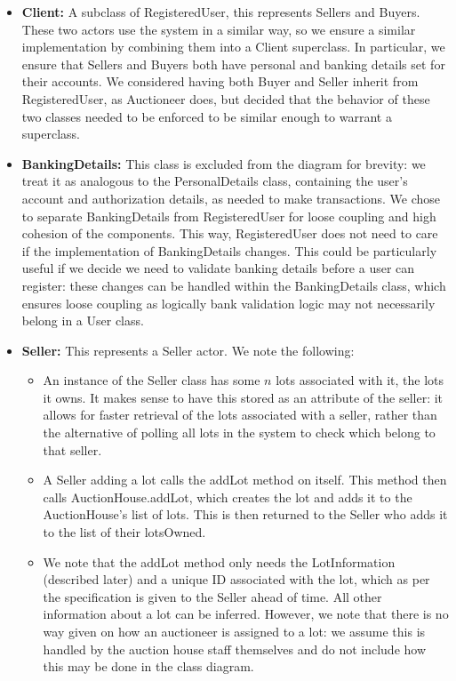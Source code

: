 \documentclass[titlepage, 12pt]{extarticle}
\begin{document}
\begin{itemize}
\item {\bf Client: } A subclass of RegisteredUser, this represents Sellers and Buyers. These two actors use the system in a similar way, so we ensure a similar implementation by combining them into a Client superclass. In particular, we ensure that Sellers and Buyers both have personal and banking details set for their accounts. We considered having both Buyer and Seller inherit from RegisteredUser, as Auctioneer does, but decided that the behavior of these two classes needed to be enforced to be similar enough to warrant a superclass. 
\item {\bf BankingDetails: } This class is excluded from the diagram for brevity: we treat it as analogous to the PersonalDetails class, containing the user's account and authorization details, as needed to make transactions. We chose to separate BankingDetails from RegisteredUser for loose coupling and high cohesion of the components. This way, RegisteredUser does not need to care if the implementation of BankingDetails changes. This could be particularly useful if we decide we need to validate banking details before a user can register: these changes can be handled within the BankingDetails class, which ensures loose coupling as logically bank validation logic may not necessarily belong in a User class. 
\item {\bf Seller: } This represents a Seller actor. We note the following:
  \begin{itemize}
  \item An instance of the Seller class has some $n$ lots associated with it, the lots it owns. It makes sense to have this stored as an attribute of the seller: it allows for faster retrieval of the lots associated with a seller, rather than the alternative of polling all lots in the system to check which belong to that seller. 
  \item A Seller adding a lot calls the addLot method on itself. This method then calls AuctionHouse.addLot, which creates the lot and adds it to the AuctionHouse's list of lots. This is then returned to the Seller who adds it to the list of their lotsOwned.
  \item We note that the addLot method only needs the LotInformation (described later) and a unique ID associated with the lot, which as per the specification is given to the Seller ahead of time. All other information about a lot can be inferred. However, we note that there is no way given on how an auctioneer is assigned to a lot: we assume this is handled by the auction house staff themselves and do not include how this may be done in the class diagram.

\end{itemize}
\end{itemize}
\end{document}
